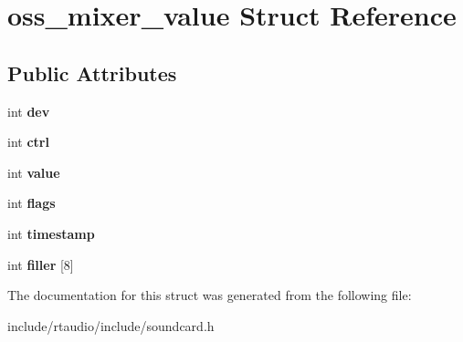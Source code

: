 \hypertarget{structoss__mixer__value}{}\section{oss\+\_\+mixer\+\_\+value Struct Reference}
\label{structoss__mixer__value}
\subsection*{Public Attributes}
\begin{DoxyCompactItemize}
\item 
int {\bfseries dev}\hypertarget{structoss__mixer__value_a856949cde596c63d7056fc6402f94842}{}\label{structoss__mixer__value_a856949cde596c63d7056fc6402f94842}

\item 
int {\bfseries ctrl}\hypertarget{structoss__mixer__value_a86a4a216405ebdb4b19d9ba829000ac3}{}\label{structoss__mixer__value_a86a4a216405ebdb4b19d9ba829000ac3}

\item 
int {\bfseries value}\hypertarget{structoss__mixer__value_aa07e2a883888aac58918652ffc7718e3}{}\label{structoss__mixer__value_aa07e2a883888aac58918652ffc7718e3}

\item 
int {\bfseries flags}\hypertarget{structoss__mixer__value_a8cc17fc09d8c163f3cfeb44c0d707bb5}{}\label{structoss__mixer__value_a8cc17fc09d8c163f3cfeb44c0d707bb5}

\item 
int {\bfseries timestamp}\hypertarget{structoss__mixer__value_afb6f1502cda3c3695aedb62fad83a91d}{}\label{structoss__mixer__value_afb6f1502cda3c3695aedb62fad83a91d}

\item 
int {\bfseries filler} \mbox{[}8\mbox{]}\hypertarget{structoss__mixer__value_af8e56e65619afb6514fd415fcfbabbc0}{}\label{structoss__mixer__value_af8e56e65619afb6514fd415fcfbabbc0}

\end{DoxyCompactItemize}


The documentation for this struct was generated from the following file\+:\begin{DoxyCompactItemize}
\item 
include/rtaudio/include/soundcard.\+h\end{DoxyCompactItemize}
